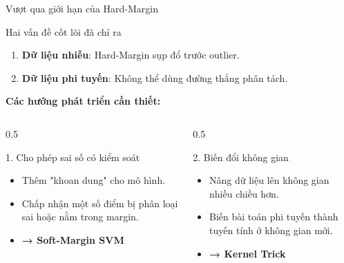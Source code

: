\begin{frame}{Vượt qua giới hạn của Hard-Margin}
  \begin{block}{Hai vấn đề cốt lõi đã chỉ ra}
    \begin{enumerate}
      \item \textbf{Dữ liệu nhiễu}: Hard-Margin sụp đổ trước outlier.
      \item \textbf{Dữ liệu phi tuyến}: Không thể dùng đường thẳng phân tách.
    \end{enumerate}
  \end{block}
  
  \vspace{0.3cm}
  \textbf{Các hướng phát triển cần thiết:}
  
  \begin{columns}[T]
    \begin{column}{0.5\textwidth}
      \begin{exampleblock}{1. Cho phép sai số có kiểm soát}
        \begin{itemize}
          \item Thêm "khoan dung" cho mô hình.
          \item Chấp nhận một số điểm bị phân loại sai hoặc nằm trong margin.
          \item \textbf{→ Soft-Margin SVM}
        \end{itemize}
      \end{exampleblock}
    \end{column}
    \begin{column}{0.5\textwidth}
      \begin{exampleblock}{2. Biến đổi không gian}
        \begin{itemize}
          \item Nâng dữ liệu lên không gian nhiều chiều hơn.
          \item Biến bài toán phi tuyến thành tuyến tính ở không gian mới.
          \item \textbf{→ Kernel Trick}
        \end{itemize}
      \end{exampleblock}
    \end{column}
  \end{columns}
  
  \vspace{0.3cm}
  \centering
\end{frame}